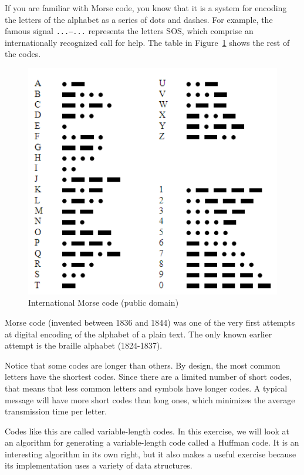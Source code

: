 If you are familiar with Morse code, you know that it is a 
system for encoding the letters of the alphabet as a series 
of dots and dashes. For example, the famous signal {\tt ...---...} 
represents the letters SOS, which comprise an 
internationally recognized call for help. The table 
in Figure~\ref{fig.morse} shows the rest of the codes.

\begin{figure}
\centerline
{\includegraphics[scale=0.6]{figs/International_Morse_Code.PNG}}
\caption{International Morse code (public domain)}
\label{fig.morse}
\end{figure}

Morse code (invented between 1836 and 1844) was one of the 
very first attempts at digital encoding of the alphabet of a 
plain text. The only known earlier attempt is the braille 
alphabet (1824-1837).

Notice that some codes are longer than others. By design, the 
most common letters have the shortest codes. Since there are a 
limited number of short codes, that means that less common letters 
and symbols have longer codes. A typical message will have more 
short codes than long ones, which minimizes the average 
transmission time per letter.

Codes like this are called variable-length codes. In this exercise, 
we will look at an algorithm for generating a variable-length code 
called a Huffman code. It is an interesting algorithm in its own 
right, but it also makes a useful exercise because its implementation 
uses a variety of data structures.

